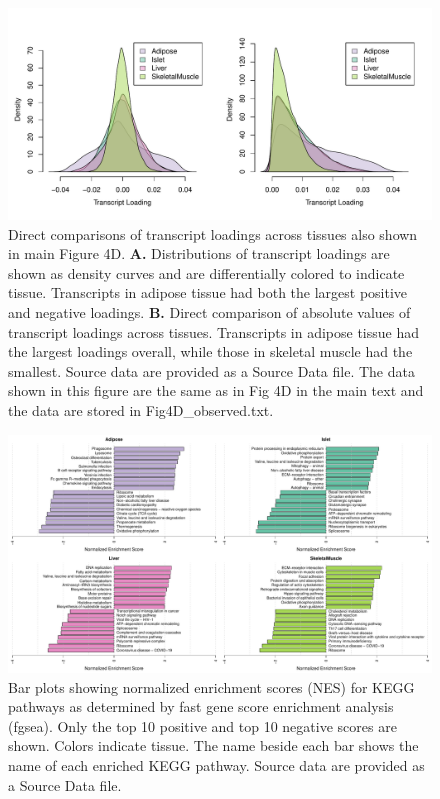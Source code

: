 \documentclass[
]{article}
\begin{document}
\begin{figure}[ht!]
\includegraphics[width=\textwidth]{Figures/Supp_Fig_transcript_load_comparison.pdf} 
\caption{Direct comparisons of transcript loadings across tissues also shown
in main Figure 4D. \textbf{A.}
Distributions of transcript loadings are shown as density curves and are 
differentially colored to indicate tissue. Transcripts in adipose tissue had 
both the largest positive and negative loadings. \textbf{B.} Direct comparison
of absolute values of transcript loadings across tissues. Transcripts in adipose
tissue had the largest loadings overall, while those in skeletal muscle had the
smallest. Source data are provided as a Source Data file. The data shown in this
figure are the same as in Fig 4D in the main text and the data are stored in 
Fig4D\_observed.txt.
}
\label{fig:transcript_loading_comparison}
\end{figure}

\begin{figure}[ht!]
\includegraphics[width=\textwidth]{Figures/Supp_Fig_enrichments_KEGG.pdf} 
\caption{Bar plots showing normalized enrichment scores (NES) for KEGG 
pathways as determined by fast gene score enrichment analysis (fgsea). 
Only the top 10 positive and top 10 negative scores are shown. Colors 
indicate tissue. The name beside each bar shows the name of each enriched 
KEGG pathway. Source data are provided as a Source Data file.
}
\label{fig:top_enrich_kegg}
\end{figure}
\end{document}
